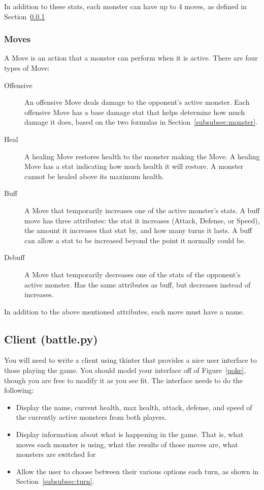 \documentclass[11pt]{cselabheader}
\begin{document}
In addition to these stats, each monster can have up to 4 moves, as defined in
Section~\ref{subsubsec:moves}

\subsubsection{Moves}
\label{subsubsec:moves}
A Move is an action that a monster can perform when it is active. There are four
types of Move:

\begin{description}
\item[Offensive] An offensive Move deals damage to the opponent's active monster.
  Each offensive Move has a base damage stat that helps determine how much damage it
  does, based on the two formulas in Section~\ref{subsubsec:monster}.
\item[Heal] A healing Move restores health to the monster making the Move. A healing
  Move has a stat indicating how much health it will restore. A monster cannot be
  healed above its maximum health.
\item[Buff] A Move that temporarily increases one of the active monster's stats. A buff move
  has three attributes: the stat it increases (Attack, Defense, or Speed), the
  amount it increases that stat by, and how many turns it lasts. A buff can allow a stat
  to be increased beyond the point it normally could be.
\item[Debuff] A Move that temporarily decreases one of the stats of the opponent's active
  monster. Has the same attributes as buff, but decreases instead of increases.
\end{description}

In addition to the above mentioned attributes, each move must have a name.

\subsection{Client (battle.py)}
You will need to write a client using tkinter that provides a nice user interface
to those playing the game. You should model your interface off of
Figure~\ref{poke}, though you are free to modify it as you see fit. The interface
needs to do the following:
\begin{itemize}
\item Display the name, current health, max health, attack, defense, and speed of the
  currently active monsters from both players.
\item Display information about what is happening in the game. That is, what moves each
  monster is using, what the results of those moves are, what monsters are switched for
\item Allow the user to choose between their various options each turn, as shown in
  Section~\ref{subsubsec:turn}.
\end{itemize}
\end{document}
